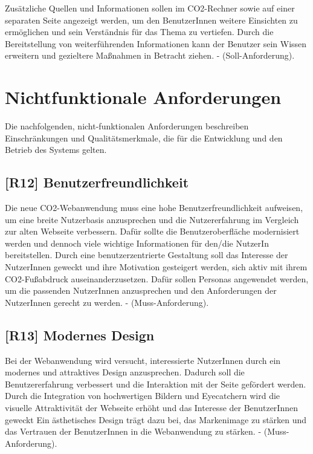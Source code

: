 Zusätzliche Quellen und Informationen sollen im CO2-Rechner sowie auf einer separaten Seite angezeigt werden, um den BenutzerInnen weitere Einsichten zu ermöglichen und sein Verständnis für das Thema zu vertiefen.
Durch die Bereitstellung von weiterführenden Informationen kann der Benutzer sein Wissen erweitern und gezieltere Maßnahmen in Betracht ziehen.
- (Soll-Anforderung).

\section{Nichtfunktionale Anforderungen}
\label{chapter:3-section:nichtfunktionale-anforderungen}

Die nachfolgenden, nicht-funktionalen Anforderungen beschreiben Einschränkungen und Qualitätsmerkmale, die für die Entwicklung und den Betrieb des Systems gelten.

\subsection{[R12] Benutzerfreundlichkeit}

Die neue CO2-Webanwendung muss eine hohe Benutzerfreundlichkeit aufweisen, um eine breite Nutzerbasis anzusprechen und die Nutzererfahrung im Vergleich zur alten Webseite verbessern.
Dafür sollte die Benutzeroberfläche modernisiert werden und dennoch viele wichtige Informationen für den/die NutzerIn bereitstellen.
Durch eine benutzerzentrierte Gestaltung soll das Interesse der NutzerInnen geweckt und ihre Motivation gesteigert werden, sich aktiv mit ihrem CO2-Fußabdruck auseinanderzusetzen.
Dafür sollen Personas angewendet werden, um die passenden NutzerInnen anzusprechen und den Anforderungen der NutzerInnen gerecht zu werden.
- (Muss-Anforderung).

\subsection{[R13] Modernes Design}

Bei der Webanwendung wird versucht, interessierte NutzerInnen durch ein modernes und attraktives Design anzusprechen.
Dadurch soll die Benutzererfahrung verbessert und die Interaktion mit der Seite gefördert werden.
Durch die Integration von hochwertigen Bildern und Eyecatchern wird die visuelle Attraktivität der Webseite erhöht und das Interesse der BenutzerInnen geweckt Ein ästhetisches Design trägt dazu bei, das Markenimage zu stärken und das Vertrauen der BenutzerInnen in die Webanwendung zu stärken.
- (Muss-Anforderung).

